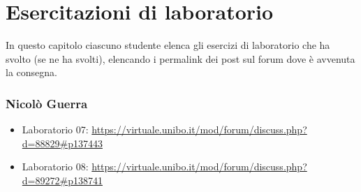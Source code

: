 \documentclass[a4paper,12pt]{report}
\begin{document}
\chapter{Esercitazioni di laboratorio}

In questo capitolo ciascuno studente elenca gli esercizi di laboratorio che ha svolto
(se ne ha svolti),
elencando i permalink dei post sul forum dove è avvenuta la consegna.

\subsection{Nicolò Guerra}
\begin{itemize}
	\item Laboratorio 07: \url{https://virtuale.unibo.it/mod/forum/discuss.php?d=88829#p137443}
	\item Laboratorio 08: \url{https://virtuale.unibo.it/mod/forum/discuss.php?d=89272#p138741}
\end{itemize}



\end{document}
